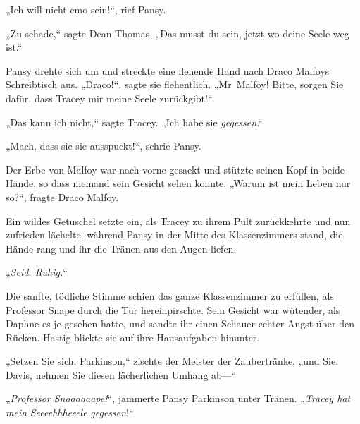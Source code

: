 „Ich will nicht emo sein!“, rief Pansy.

„Zu schade,“ sagte Dean Thomas. „Das musst du sein, jetzt wo deine Seele weg ist.“

Pansy drehte sich um und streckte eine flehende Hand nach Draco Malfoys Schreibtisch aus. „Draco!“, sagte sie flehentlich. „Mr~Malfoy! Bitte, sorgen Sie dafür, dass Tracey mir meine Seele zurückgibt!“

„Das kann ich nicht,“ sagte Tracey. „Ich habe sie \emph{gegessen}.“

„Mach, dass sie sie ausspuckt!“, schrie Pansy.

Der Erbe von Malfoy war nach vorne gesackt und stützte seinen Kopf in beide Hände, so dass niemand sein Gesicht sehen konnte. „Warum ist mein Leben nur so?“, fragte Draco Malfoy.

Ein wildes Getuschel setzte ein, als Tracey zu ihrem Pult zurückkehrte und nun zufrieden lächelte, während Pansy in der Mitte des Klassenzimmers stand, die Hände rang und ihr die Tränen aus den Augen liefen.

„\emph{Seid. Ruhig.}“

Die sanfte, tödliche Stimme schien das ganze Klassenzimmer zu erfüllen, als Professor Snape durch die Tür hereinpirschte. Sein Gesicht war wütender, als Daphne es je gesehen hatte, und sandte ihr einen Schauer echter Angst über den Rücken. Hastig blickte sie auf ihre Hausaufgaben hinunter.

„Setzen Sie sich, Parkinson,“ zischte der Meister der Zaubertränke, „und Sie, Davis, nehmen Sie diesen lächerlichen Umhang ab—“

„\emph{Professor Snaaaaaape!}“, jammerte Pansy Parkinson unter Tränen. „\emph{Tracey hat mein} \emph{Seeeehhheeele} \emph{gegessen}!“

